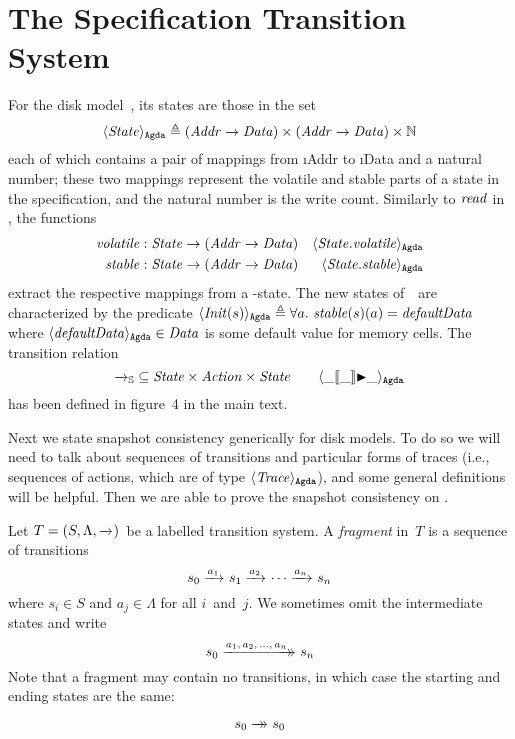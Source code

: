 
\section{The Specification Transition System~\Spec}
\label{sec:Spec}

For the disk model~\Spec, its states are those in the set
$$ \langle \mathit{State} \rangle_\mathtt{Agda} {}\triangleq{} (\mathit{Addr} \to \mathit{Data}) \times (\mathit{Addr} \to \mathit{Data}) \times \mathbb N $$
each of which contains a pair of mappings from \i{Addr} to \i{Data} and a natural number; these two mappings represent the volatile and stable parts of a state in the specification, and the natural number is the write count.
Similarly to $\mathit{read}$ in \Prog, the functions
\begin{align*}
\mathit{volatile} &: \mathit{State} \to (\mathit{Addr} \to \mathit{Data}) & \langle \mathit{State}.\mathit{volatile} \rangle_\mathtt{Agda} \\
\mathit{stable} &: \mathit{State} \to (\mathit{Addr} \to \mathit{Data}) & \langle \mathit{State}.\mathit{stable} \rangle_\mathtt{Agda}
\end{align*}
extract the respective mappings from a \Spec-state.
The new states of~\Spec\ are characterized by the predicate $\AgdaId{\id{Init}(s)} \defeq \forall a.\ \id{stable}(s)(a) = \id{defaultData}$ where $\langle \mathit{defaultData} \rangle_\mathtt{Agda} \in \mathit{Data}$ is some default value for memory cells.
The transition relation
$$ {\xrightarrow{}_{\mathbb S}} \subseteq \mathit{State} \times \mathit{Action} \times \mathit{State} \qquad \langle \_[\kern-1.5pt[\_]\kern-1.5pt]{\blacktriangleright}\_ \rangle_\mathtt{Agda} $$
has been defined in figure~4 in the main text.

Next we state snapshot consistency generically for disk models.
To do so we will need to talk about sequences of transitions and particular forms of traces (i.e., sequences of actions, which are of type $\langle \mathit{Trace} \rangle_\mathtt{Agda}$), and some general definitions will be helpful.
Then we are able to prove the snapshot consistency on \Spec.

\begin{definition}\label{def:frag}
Let $T = (S, \Lambda, \xrightarrow{}_{})$~be a labelled transition system.
A \emph{fragment} in~$T$ is a sequence of transitions
$$ s_0 \xrightarrow{a_1}_{} s_1 \xrightarrow{a_2}_{} \cdots \xrightarrow{a_n}_{} s_n $$
where $s_i \in S$ and $a_j \in \Lambda$ for all $i$~and~$j$.
We sometimes omit the intermediate states and write
$$ s_0 \xrightarrow{a_1,\,a_2,\,\ldots,\,a_n}\mathrel{\mkern-14mu}\rightarrow_{} s_n $$
Note that a fragment may contain no transitions, in which case the starting and ending states are the same: 
$$ s_0 \xrightarrow{\vphantom{a_n}}\mathrel{\mkern-14mu}\rightarrow_{} s_0 $$
\end{definition}

